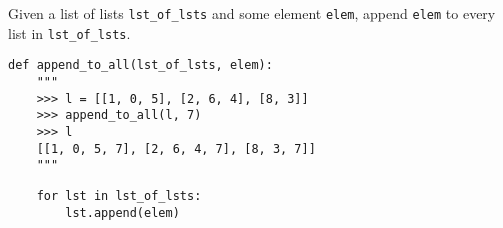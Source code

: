 \begin{blocksection}
\question Given a list of lists \lstinline$lst_of_lsts$ and some element \lstinline$elem$, append \lstinline$elem$ to every list in \lstinline$lst_of_lsts$.

\begin{lstlisting}
def append_to_all(lst_of_lsts, elem):
    """
    >>> l = [[1, 0, 5], [2, 6, 4], [8, 3]]
    >>> append_to_all(l, 7)
    >>> l
    [[1, 0, 5, 7], [2, 6, 4, 7], [8, 3, 7]]
    """
\end{lstlisting}

\begin{solution}[1in]
\begin{lstlisting}
    for lst in lst_of_lsts:
        lst.append(elem)
\end{lstlisting}
\end{solution}
\end{blocksection}
